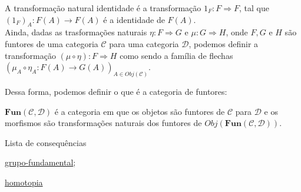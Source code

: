 A transformação natural identidade é a transformação $1_F:F \Longrightarrow F$, tal que $(1_F)_A: F(A) \longrightarrow F(A)$ é a identidade de $F(A)$. \\
Ainda, dadas as trasformações naturais $\eta:F \Longrightarrow G$ e $\mu: G \Longrightarrow H$, onde $F, G$ e $H$ são funtores de uma categoria $\mathcal{C}$ para uma categoria $\mathcal{D}$, podemos definir a transformação $(\mu \circ \eta): F \Longrightarrow H$ como sendo a família de flechas $(\mu_A \circ \eta_A: F(A) \longrightarrow G(A))_{A \in Obj(\mathcal{C})}$.

Dessa forma, podemos definir o que é a categoria de funtores: 

$\mathbf{Fun(\mathcal{C}, \mathcal{D})}$ é a categoria em que os objetos são funtores de $\mathcal{C}$ para $\mathcal{D}$ e os morfismos são transformações naturais dos funtores de $Obj(\mathbf{Fun(\mathcal{C}, \mathcal{D})})$.

\begin{titlemize}{Lista de consequências}
	\item \hyperref[grupo-fundamental]{grupo-fundamental};\\ %
	\item \hyperref[homotopia]{homotopia}
\end{titlemize}

